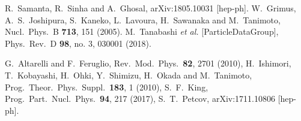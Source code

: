 \documentclass[11pt]{article}
\providecommand{\xlink}[1]
  {\href{http://arxiv.org/abs/#1}{arXiv:#1}}
\begin{document}
\begin{thebibliography}{9}
  R.~Samanta, R.~Sinha and A.~Ghosal,
  arXiv:1805.10031 [hep-ph].
W.~Grimus, A.~S.~Joshipura, S.~Kaneko, L.~Lavoura, H.~Sawanaka and M.~Tanimoto,
  Nucl.\ Phys.\ B {\bf 713}, 151 (2005).
  M.~Tanabashi {\it et al.} [ParticleDataGroup],
  Phys.\ Rev.\ D {\bf 98}, no. 3, 030001 (2018).

  
  
  
  G.~Altarelli and F.~Feruglio,
  Rev.\ Mod.\ Phys.\  {\bf 82}, 2701 (2010),
   H.~Ishimori, T.~Kobayashi, H.~Ohki, Y.~Shimizu, H.~Okada and M.~Tanimoto,
  Prog.\ Theor.\ Phys.\ Suppl.\  {\bf 183}, 1 (2010),
  S.~F.~King,
  Prog.\ Part.\ Nucl.\ Phys.\  {\bf 94}, 217 (2017),
   S.~T.~Petcov,
  arXiv:1711.10806 [hep-ph].


\end{thebibliography}
\end{document}
